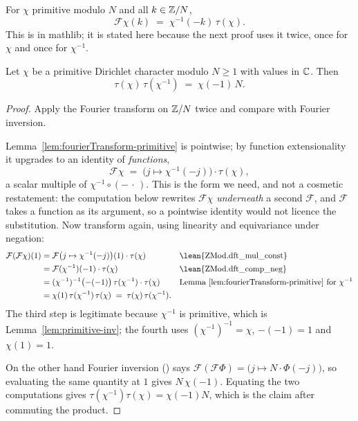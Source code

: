 \begin{lemma}
  \label{lem:fourierTransform-primitive}
  \leanok
  For $\chi$ primitive modulo $N$ and all $k \in \mathbb{Z}/N$,
  \[ \mathcal{F}\chi(k) \;=\; \chi^{-1}(-k)\, \tau(\chi). \]
  This is in mathlib; it is stated here because the next proof uses it twice, once for
  $\chi$ and once for $\chi^{-1}$.
\end{lemma}

\begin{theorem}
  \label{thm:gaussSum-mul-inv}
  \leanok
  Let $\chi$ be a primitive Dirichlet character modulo $N \geq 1$ with values in $\mathbb{C}$.
  Then
  \[ \tau(\chi)\, \tau(\chi^{-1}) \;=\; \chi(-1)\, N. \]
\end{theorem}
\begin{proof}
  \leanok
  Apply the Fourier transform on $\mathbb{Z}/N$ twice and compare with Fourier inversion.

  Lemma~\ref{lem:fourierTransform-primitive} is pointwise; by function extensionality it
  upgrades to an identity of \emph{functions},
  \[ \mathcal{F}\chi \;=\; \bigl( j \mapsto \chi^{-1}(-j) \bigr) \cdot \tau(\chi), \]
  a scalar multiple of $\chi^{-1} \circ (-\,\cdot\,)$. This is the form we need, and not
  a cosmetic restatement: the computation below rewrites $\mathcal{F}\chi$
  \emph{underneath} a second $\mathcal{F}$, and $\mathcal{F}$ takes a function as its
  argument, so a pointwise identity would not licence the substitution. Now transform
  again, using linearity and equivariance under negation:
  \begin{align*}
    \mathcal{F}(\mathcal{F}\chi)(1)
      &= \mathcal{F}\bigl( j \mapsto \chi^{-1}(-j) \bigr)(1) \cdot \tau(\chi)
        && \text{\lean{ZMod.dft\_mul\_const}} \\
      &= \mathcal{F}(\chi^{-1})(-1) \cdot \tau(\chi)
        && \text{\lean{ZMod.dft\_comp\_neg}} \\
      &= (\chi^{-1})^{-1}\bigl(-(-1)\bigr)\, \tau(\chi^{-1}) \cdot \tau(\chi)
        && \text{Lemma~\ref{lem:fourierTransform-primitive} for } \chi^{-1} \\
      &= \chi(1)\, \tau(\chi^{-1})\, \tau(\chi) \;=\; \tau(\chi)\,\tau(\chi^{-1}).
  \end{align*}
  The third step is legitimate because $\chi^{-1}$ is primitive, which is
  Lemma~\ref{lem:primitive-inv}; the fourth uses $(\chi^{-1})^{-1} = \chi$,
  $-(-1) = 1$ and $\chi(1) = 1$.

  On the other hand Fourier inversion () says
  $\mathcal{F}(\mathcal{F}\Phi) = \bigl( j \mapsto N \cdot \Phi(-j) \bigr)$, so
  evaluating the same quantity at $1$ gives $N\, \chi(-1)$. Equating the two computations
  gives $\tau(\chi^{-1})\tau(\chi) = \chi(-1) N$, which is the claim after commuting the
  product.
\end{proof}

